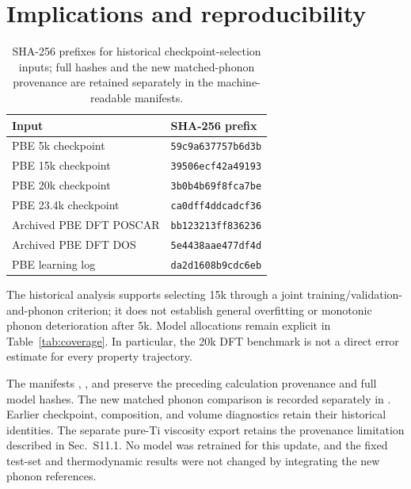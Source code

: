 \documentclass[10pt]{article}
\begin{document}
\section{Implications and reproducibility}

\begin{table}[!htbp]
\centering
\caption{SHA-256 prefixes for historical checkpoint-selection inputs; full hashes and the new matched-phonon provenance are retained separately in the machine-readable manifests.}
\label{tab:hashes}
\begin{tabular}{ll}
\toprule
Input & SHA-256 prefix\\
\midrule
PBE 5k checkpoint & \texttt{59c9a637757b6d3b}\\
PBE 15k checkpoint & \texttt{39506ecf42a49193}\\
PBE 20k checkpoint & \texttt{3b0b4b69f8fca7be}\\
PBE 23.4k checkpoint & \texttt{ca0dff4ddcadcf36}\\
Archived PBE DFT POSCAR & \texttt{bb123213ff836236}\\
Archived PBE DFT DOS & \texttt{5e4438aae477df4d}\\
PBE learning log & \texttt{da2d1608b9cdc6eb}\\
\bottomrule
\end{tabular}
\end{table}

The historical analysis supports selecting 15k through a joint training/validation-and-phonon criterion; it does not establish general overfitting or monotonic phonon deterioration after 5k. Model allocations remain explicit in Table~\ref{tab:coverage}. In particular, the 20k DFT benchmark is not a direct error estimate for every property trajectory.

The manifests , , and  preserve the preceding calculation provenance and full model hashes. The new matched phonon comparison is recorded separately in . Earlier checkpoint, composition, and volume diagnostics retain their historical identities. The separate pure-Ti viscosity export retains the provenance limitation described in Sec.~S11.1. No model was retrained for this update, and the fixed test-set and thermodynamic results were not changed by integrating the new phonon references.

\renewcommand{\bibsection}{\par\medskip\noindent{\large\bfseries References}\par\smallskip}


\end{document}
